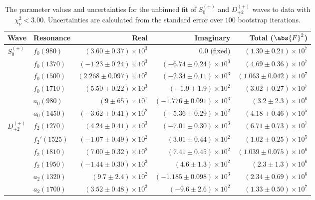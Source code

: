 \begin{table}[ht]
    \begin{center}
        \begin{tabular}{llrrr}\toprule
        Wave & Resonance & Real & Imaginary & Total ($\abs{F}^2$) \\\midrule
$S_{0}^{(+)}$ & $f_{0}(980)$ & $(3.60 \pm 0.37) \times 10^{3}$ & $0.0$ (fixed) & $(1.30 \pm 0.21) \times 10^{7}$ \\
 & $f_{0}(1370)$ & $(-1.23 \pm 0.24) \times 10^{3}$ & $(-6.74 \pm 0.24) \times 10^{3}$ & $(4.69 \pm 0.36) \times 10^{7}$ \\
 & $f_{0}(1500)$ & $(2.268 \pm 0.097) \times 10^{3}$ & $(-2.34 \pm 0.11) \times 10^{3}$ & $(1.063 \pm 0.042) \times 10^{7}$ \\
 & $f_{0}(1710)$ & $(5.50 \pm 0.22) \times 10^{3}$ & $(-1.9 \pm 1.9) \times 10^{2}$ & $(3.02 \pm 0.27) \times 10^{7}$ \\
 & $a_{0}(980)$ & $(9 \pm 65) \times 10^{1}$ & $(-1.776 \pm 0.091) \times 10^{3}$ & $(3.2 \pm 2.3) \times 10^{6}$ \\
 & $a_{0}(1450)$ & $(-3.62 \pm 0.41) \times 10^{2}$ & $(-5.36 \pm 0.29) \times 10^{2}$ & $(4.18 \pm 0.46) \times 10^{5}$ \\
$D_{+2}^{(+)}$ & $f_{2}(1270)$ & $(4.24 \pm 0.41) \times 10^{3}$ & $(-7.01 \pm 0.30) \times 10^{3}$ & $(6.71 \pm 0.73) \times 10^{7}$ \\
 & $f_{2}'(1525)$ & $(-1.07 \pm 0.49) \times 10^{2}$ & $(3.01 \pm 0.44) \times 10^{2}$ & $(1.02 \pm 0.25) \times 10^{5}$ \\
 & $f_{2}(1810)$ & $(7.00 \pm 0.32) \times 10^{2}$ & $(7.41 \pm 0.45) \times 10^{2}$ & $(1.039 \pm 0.075) \times 10^{6}$ \\
 & $f_{2}(1950)$ & $(-1.44 \pm 0.30) \times 10^{3}$ & $(4.6 \pm 1.3) \times 10^{2}$ & $(2.3 \pm 1.3) \times 10^{6}$ \\
 & $a_{2}(1320)$ & $(9.7 \pm 2.4) \times 10^{2}$ & $(-1.185 \pm 0.098) \times 10^{3}$ & $(2.34 \pm 0.69) \times 10^{6}$ \\
 & $a_{2}(1700)$ & $(3.52 \pm 0.48) \times 10^{3}$ & $(-9.6 \pm 2.6) \times 10^{2}$ & $(1.33 \pm 0.50) \times 10^{7}$ \\\bottomrule
        \end{tabular}
    \caption{The parameter values and uncertainties for the unbinned fit of $S_{0}^{(+)}$ and $D_{+2}^{(+)}$ waves to data with $\chi^2_\nu < 3.00$. Uncertainties are calculated from the standard error over $100$ bootstrap iterations.}\label{tab:unbinned-fit-chisqdof-3.0-Sp0p-Dp2p}
    \end{center}
\end{table}
